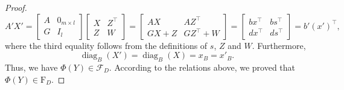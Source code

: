 \documentclass[10pt,a4paper]{amsart}
\def\F{\mathcal{F}}
\begin{document}
\begin{proof}
\[
A'X'
=\begin{bmatrix}
A&0_{m\times l}\\
 G&I_l
\end{bmatrix}\begin{bmatrix}
X&Z^\top\\
Z&W
\end{bmatrix}
=\begin{bmatrix}
AX&AZ^\top\\
GX+Z&GZ^\top+W
\end{bmatrix}
=\begin{bmatrix}
bx^\top&bs^\top\\
dx^\top&ds^\top
\end{bmatrix}
=b'(x')^\top,
\]
where the third equality follows from the definitions of $s$, $Z$ and $W$. Furthermore, 
\[
\operatorname{diag}_B(X')=\operatorname{diag}_B(X)=x_B=x'_B.
\] 
Thus, we have $\Phi(Y)\in \F_D$. According to the relations above, we proved that $\Phi(Y)\in{\mathrm{F}_D}$.
\smallskip


\end{proof}
\end{document}
